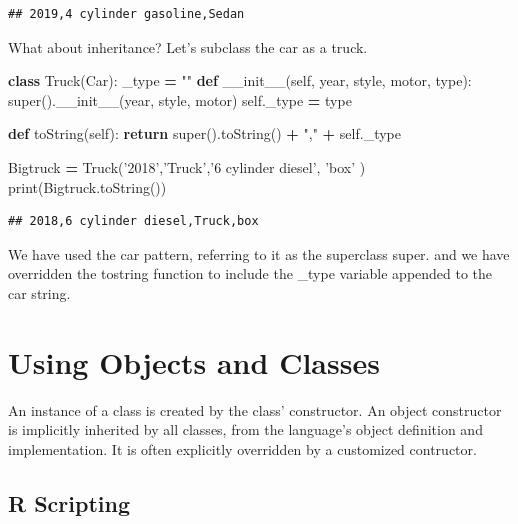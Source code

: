 \documentclass[]{book}
\newenvironment{Shaded}{\begin{snugshade}}{\end{snugshade}}
\newcommand{\KeywordTok}[1]{\textcolor[rgb]{0.13,0.29,0.53}{\textbf{#1}}}
\newcommand{\StringTok}[1]{\textcolor[rgb]{0.31,0.60,0.02}{#1}}
\newcommand{\FunctionTok}[1]{\textcolor[rgb]{0.00,0.00,0.00}{#1}}
\newcommand{\VariableTok}[1]{\textcolor[rgb]{0.00,0.00,0.00}{#1}}
\newcommand{\ControlFlowTok}[1]{\textcolor[rgb]{0.13,0.29,0.53}{\textbf{#1}}}
\newcommand{\OperatorTok}[1]{\textcolor[rgb]{0.81,0.36,0.00}{\textbf{#1}}}
\newcommand{\BuiltInTok}[1]{#1}
\newcommand{\NormalTok}[1]{#1}
\theoremstyle{definition}
\theoremstyle{definition}
\theoremstyle{definition}
\theoremstyle{remark}
\begin{document}
\begin{verbatim}
## 2019,4 cylinder gasoline,Sedan
\end{verbatim}

What about inheritance? Let's subclass the car as a truck.

\begin{Shaded}
\begin{Highlighting}[]
\KeywordTok{class}\NormalTok{ Truck(Car):}
\NormalTok{    _type }\OperatorTok{=} \StringTok{""}
    \KeywordTok{def} \FunctionTok{__init__}\NormalTok{(}\VariableTok{self}\NormalTok{, year, style, motor, }\BuiltInTok{type}\NormalTok{):}
        \BuiltInTok{super}\NormalTok{().}\FunctionTok{__init__}\NormalTok{(year, style, motor)}
        \VariableTok{self}\NormalTok{._type }\OperatorTok{=} \BuiltInTok{type}
   
    \KeywordTok{def}\NormalTok{ toString(}\VariableTok{self}\NormalTok{):}
        \ControlFlowTok{return} \BuiltInTok{super}\NormalTok{().toString() }\OperatorTok{+} \StringTok{","} \OperatorTok{+} \VariableTok{self}\NormalTok{._type}
        
\NormalTok{Bigtruck }\OperatorTok{=}\NormalTok{ Truck(}\StringTok{'2018'}\NormalTok{,}\StringTok{'Truck'}\NormalTok{,}\StringTok{'6 cylinder diesel'}\NormalTok{, }\StringTok{'box'}\NormalTok{ )}
\BuiltInTok{print}\NormalTok{(Bigtruck.toString())}
\end{Highlighting}
\end{Shaded}

\begin{verbatim}
## 2018,6 cylinder diesel,Truck,box
\end{verbatim}

We have used the car pattern, referring to it as the superclass super.
and we have overridden the tostring function to include the \_type
variable appended to the car string.

\section{Using Objects and Classes}\label{using-objects-and-classes}

An instance of a class is created by the class' constructor. An object
constructor is implicitly inherited by all classes, from the language's
object definition and implementation. It is often explicitly overridden
by a customized contructor.

\subsection{R Scripting}\label{r-scripting-4}
\end{document}

